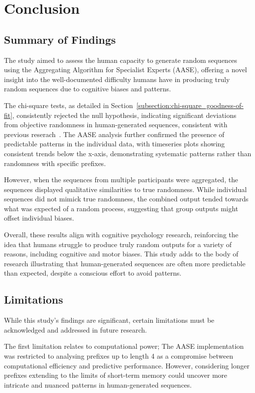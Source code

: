 \section{Conclusion}\label{section:conclusion}
\subsection{Summary of Findings}\label{subsection:summary_of_findings}
The study aimed to assess the human capacity to generate random sequences using the Aggregating Algorithm for Specialist Experts (AASE), offering a novel insight into the well-documented difficulty humans have in producing truly random sequences due to cognitive biases and patterns.

The chi-square tests, as detailed in Section~\ref{subsection:chi-square_goodness-of-fit}, consistently rejected the null hypothesis, indicating significant deviations from objective randomness in human-generated sequences, consistent with previous reserach~\cite{nickerson:2009}. The AASE analysis further confirmed the presence of predictable patterns in the individual data, with timeseries plots showing consistent trends below the x-axis, demonstrating systematic patterns rather than randomness with specific prefixes.

However, when the sequences from multiple participants were aggregated, the sequences displayed qualitative similarities to true randomness. While individual sequences did not mimick true randomness, the combined output tended towards what was expected of a random process, suggesting that group outputs might offset individual biases.

Overall, these results align with cognitive psychology research, reinforcing the idea that humans struggle to produce truly random outputs for a variety of reasons, including cognitive and motor biases. This study adds to the body of research illustrating that human-generated sequences are often more predictable than expected, despite a conscious effort to avoid patterns.

\subsection{Limitations}\label{subsection:limitations}
While this study's findings are significant, certain limitations must be acknowledged and addressed in future research.

The first limitation relates to computational power; The AASE implementation was restricted to analysing prefixes up to length 4 as a compromise between computational efficiency and predictive performance. However, considering longer prefixes \textendash{} extending to the limits of short-term memory \textendash{} could uncover more intricate and nuanced patterns in human-generated sequences.

